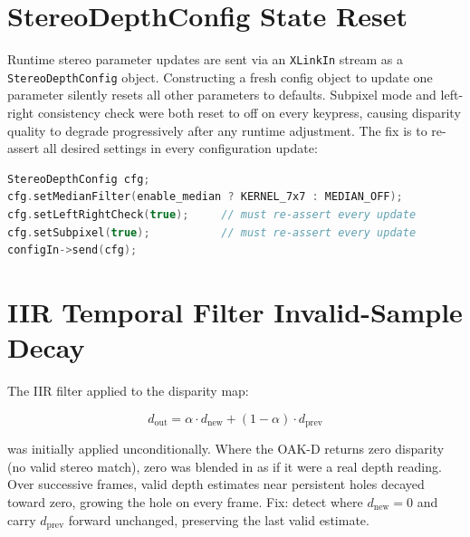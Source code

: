 \documentclass[11pt, a4paper]{report}
\begin{document}
\section{StereoDepthConfig State Reset}

Runtime stereo parameter updates are sent via an \texttt{XLinkIn} stream
as a \texttt{StereoDepthConfig} object.
Constructing a fresh config object to update one parameter silently resets
all other parameters to defaults.
Subpixel mode and left-right consistency check were both reset to off on
every keypress, causing disparity quality to degrade progressively after
any runtime adjustment.
The fix is to re-assert all desired settings in every configuration update:

\begin{lstlisting}[language=C++,
  caption={StereoDepthConfig update with explicit re-assertion.
    All flags must be set on every update; constructing a fresh config
    object silently resets omitted flags to their defaults.}]
StereoDepthConfig cfg;
cfg.setMedianFilter(enable_median ? KERNEL_7x7 : MEDIAN_OFF);
cfg.setLeftRightCheck(true);     // must re-assert every update
cfg.setSubpixel(true);           // must re-assert every update
configIn->send(cfg);
\end{lstlisting}

\section{IIR Temporal Filter Invalid-Sample Decay}

The IIR filter applied to the disparity map:

\begin{equation}
    d_{\mathrm{out}} = \alpha \cdot d_{\mathrm{new}} +
                       (1 - \alpha) \cdot d_{\mathrm{prev}}
    \label{eq:iir}
\end{equation}

was initially applied unconditionally.
Where the OAK-D returns zero disparity (no valid stereo match), zero was
blended in as if it were a real depth reading.
Over successive frames, valid depth estimates near persistent holes
decayed toward zero, growing the hole on every frame.
Fix: detect where $d_{\mathrm{new}} = 0$ and carry $d_{\mathrm{prev}}$
forward unchanged, preserving the last valid estimate.

\end{document}

